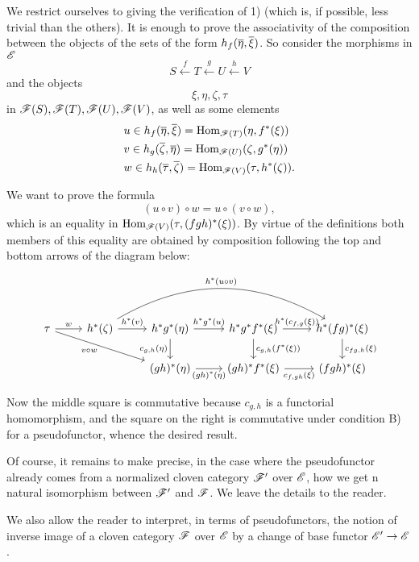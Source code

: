\documentclass[../main.tex]{subfiles}
\begin{document}
We restrict ourselves to giving the verification of 1) (which is, if possible, less trivial than the others). It is enough to prove the associativity of the composition between the objects of the sets of the form $h_f (\overline \eta, \overline \xi)$. So consider the morphisms in $\mathscr{E}$
\[
    S \xleftarrow{f} T \xleftarrow{g} U \xleftarrow{h} V
\]
and the objects
\[\xi, \eta, \zeta, \tau\]
in $\mathscr{F} (S), \mathscr{F} (T), \mathscr{F} (U), \mathscr{F} (V)$, as well as some elements
\begin{align*}
    &u \in h_f(\overline \eta, \overline \xi) = \mathrm{Hom}_{\mathscr{F}(T)} (\eta, f^\ast(\xi))\\
    &v \in h_g(\overline \zeta, \overline \eta) = \mathrm{Hom}_{\mathscr{F}(U)} (\zeta, g^\ast(\eta))\\
    &w \in h_h(\overline \tau, \overline \zeta) = \mathrm{Hom}_{\mathscr{F}(V)} (\tau, h^\ast(\zeta)).
\end{align*}

We want to prove the formula
\[(u \circ v) \circ w = u \circ (v \circ w),
\]
which is an equality in $\mathrm{Hom}_{\mathscr{F} (V)} (\tau, (fgh)^\ast(\xi))$. By virtue of the definitions both members of this equality are obtained by composition following the top and bottom arrows of the diagram below:

\[
\begin{tikzcd}
    \tau
    \arrow[r, "w"]
    \arrow[rrd, "v \circ w", swap]
    &
    h^\ast(\zeta) 
    \arrow[r, "h^\ast(v)"]
    \arrow[rrr, "h^\ast (u \circ v)", bend left]
    &
    h^\ast g^\ast(\eta)
    \arrow[r, "h^\ast g^\ast (u)"]
    \arrow[d, "c_{g,h}(\eta)", swap]
    &
    h^\ast g^\ast f^\ast (\xi)
    \arrow[r, "h^\ast (c_{f,g}(\xi))"]
    \arrow[d, "c_{g,h}(f^\ast (\xi))"]
    &
    h^\ast (fg)^\ast (\xi)
    \arrow[d, "c_{fg,h}(\xi)"]
    \\&&
    (gh)^\ast (\eta)
    \arrow[r, "(gh)^\ast (\eta)", swap]
    &
    (gh)^\ast f^\ast (\xi)
    \arrow[r, "c_{f,gh}(\xi)", swap]
    &
    (fgh)^\ast (\xi)
\end{tikzcd}\]

Now the middle square is commutative because $c_{g, h}$ is a functorial homomorphism, and the square on the right is commutative under condition B) for a pseudofunctor, whence the desired result.

Of course, it remains to make precise, in the case where the pseudofunctor already comes from a normalized cloven category $\mathscr{F}'$ over $\mathscr{E}$, how we get n natural isomorphism between $\mathscr{F}'$ and $\mathscr{F}$. We leave the details to the reader.

We also allow the reader to interpret, in terms of pseudofunctors, the notion of inverse image of a cloven category $\mathscr{F}$ over $\mathscr{E}$ by a change of base functor $\mathscr{E}'\to \mathscr{E}$.
\end{document}
